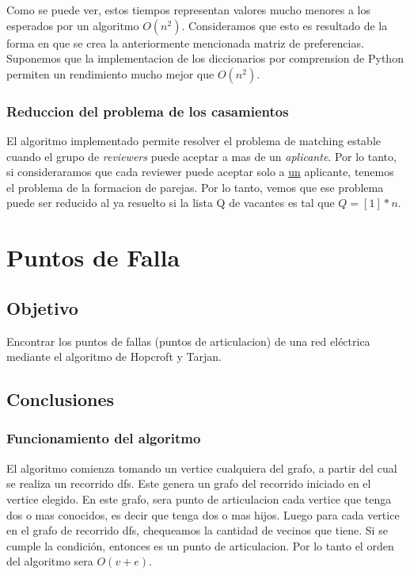 \documentclass{article}
\begin{document}
                Como se puede ver, estos tiempos representan valores mucho menores a
                los esperados por un algoritmo $O(n^2)$. Consideramos que esto es
                resultado de la forma en que se crea la anteriormente mencionada
                matriz de preferencias. Suponemos que la implementacion de los
                diccionarios por comprension de Python permiten un rendimiento mucho
                mejor que $O(n^2)$.
            \subsubsection{Reduccion del problema de los casamientos}
                El algoritmo implementado permite resolver el problema de matching
                estable cuando el grupo de \emph{reviewers} puede aceptar a mas de
                un \emph{aplicante}. Por lo tanto, si consideraramos que cada reviewer
                puede aceptar solo a \underline{un} aplicante, tenemos el problema
                de la formacion de parejas. Por lo tanto, vemos que ese problema
                puede ser reducido al ya resuelto si la lista Q de vacantes es tal
                que $Q = [1]*n$.

    \section{Puntos de Falla}
        \subsection{Objetivo}
            Encontrar los puntos de fallas (puntos de articulacion) de una red eléctrica
            mediante el algoritmo de Hopcroft y Tarjan.
        \subsection{Conclusiones}
            \subsubsection{Funcionamiento del algoritmo}
                El algoritmo comienza tomando un vertice cualquiera del grafo, a partir
                del cual se realiza un recorrido dfs. Este genera un grafo del recorrido
                iniciado en el vertice elegido. En este grafo, sera punto de articulacion
                cada vertice que tenga dos o mas conocidos, es decir que tenga dos o mas
                hijos. Luego para cada vertice en el grafo de recorrido dfs, chequeamos
                la cantidad de vecinos que tiene. Si se cumple la condición, entonces es un punto
                de articulacion. Por lo tanto el orden del algoritmo sera $O(v+e)$.
\end{document}
